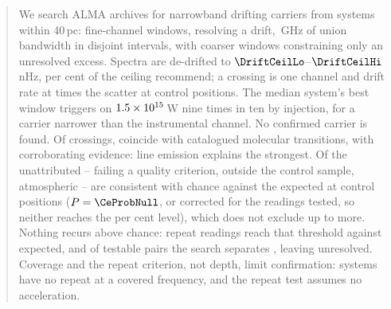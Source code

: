 \begin{abstract}
We search ALMA archives for narrowband drifting carriers from \NSysClassA{}
systems within 40\,pc: \NWinA{} fine-channel windows, \EdrNWinA{} resolving
a drift, \CvUnionA\,GHz of union bandwidth in \CovNIslands{} disjoint
intervals, with \NWinB{} coarser windows constraining only an unresolved
excess. Spectra are de-drifted to $\DriftCeilLo$--$\DriftCeilHi$\,nHz,
\AccelSheikhPct{} per cent of the ceiling \citet{Sheikh2019} recommend; a
crossing is one channel and drift rate at \StageNullTrig{} times the scatter
at control positions. The median system's best window triggers on
$\EirpNinetySysMedA$\,W nine times in ten by injection, for a carrier
narrower than the instrumental channel.
No confirmed carrier is found. Of \EvNCrossRaw{} crossings, \MkNCoinc{}
coincide with catalogued molecular transitions, \LnAttrSupp{} with
corroborating evidence: line emission explains the strongest. Of the
\MkUnattr{} unattributed -- \PrFlagXrossWord{} failing a quality criterion,
\CeNTailCrossWord{} outside the control sample, \CeTlObsCutWord{}
atmospheric -- \CeObs{} are consistent with chance against the \CeExp{}
expected at control positions ($P=\CeProbNull$, or \FrTwoTrialP{} corrected
for the \FrNReadWord{} readings tested, so neither reaches the
\CeAlphaPct{} per cent level), which does not exclude up to \CeAddLim{} more.
Nothing recurs above chance: \WdNExc{} repeat readings reach that threshold
against \WdExpect{} expected, and of \TjNPair{} testable pairs the search separates \TjNExcl{},
leaving \TjNOpen{} unresolved. Coverage and the repeat criterion, not depth,
limit confirmation: \ZcNoRepSys{} systems have no repeat at a covered
frequency, and the repeat test assumes no acceleration.
\end{abstract}


